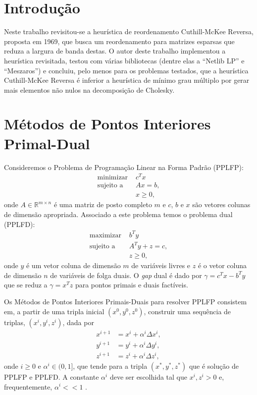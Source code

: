 % 
% 
% 

\section{Introdução}
Neste trabalho revisitou-se a heurística de reordenamento Cuthill-McKee Reversa,
proposta em 1969, que busca um reordenamento para matrizes esparsas que reduza a
largura de banda destas. O autor deste trabalho implementou a heurística
revisitada, testou com várias bibliotecas (dentre elas a ``Netlib LP'' e
``Meszaros'') e concluiu, pelo menos para os problemas testados, que a
heurística Cuthill-McKee Reversa é inferior a heurística de mínimo grau
múltiplo por gerar mais elementos não nulos na decomposição de Cholesky.

\section{Métodos de Pontos Interiores Primal-Dual}
Consideremos o Problema de Programação Linear na Forma Padrão (PPLFP):
\begin{align*}
    \text{minimizar } & c^T x \\
    \text{sujeito a } & A x = b, \\
    & x \geq 0,
\end{align*}
onde $A \in \mathbb{R}^{m \times n}$ é uma matriz de posto completo $m$ e $c$,
$b$ e $x$ são vetores colunas de dimensão apropriada. Associado a este problema
temos o problema dual (PPLFD):
\begin{align*}
    \text{maximizar } & b^T y \\
    \text{sujeito a } & A^T y + z = c, \\
    & z \geq 0,
\end{align*}
onde $y$ é um vetor coluna de dimensão $m$ de variáveis livres e $z$ é o vetor
coluna de dimensão $n$ de variáveis de folga duais. O \textit{gap} dual é dado
por $\gamma = c^T x - b^T y$ que se reduz a $\gamma = x^T z$ para pontos primais
e duais factíveis.

Os Métodos de Pontos Interiores Primais-Duais para resolver PPLFP consistem em, a
partir de uma tripla inicial $(x^0, y^0, z^0)$, construir uma
sequência de triplas, $(x^i, y^i, z^i)$, dada por
\begin{align*}
    x^{i + 1} &= x^i + \alpha^i \Delta x^i, \\
    y^{i + 1} &= y^i + \alpha^i \Delta y^i, \\
    z^{i + 1} &= z^i + \alpha^i \Delta z^i,
\end{align*}
onde $i \geq 0$ e $\alpha^i \in (0, 1]$, que tende para a tripla $(x^*, y^*, z^*)$ que é
solução de PPLFP e PPLFD. A constante $\alpha^i$ deve ser escolhida tal que $x^i,
z^i > 0$ e, frequentemente, $\alpha^i << 1$ \cite{Wright:1987:PrimalDualIP}.

